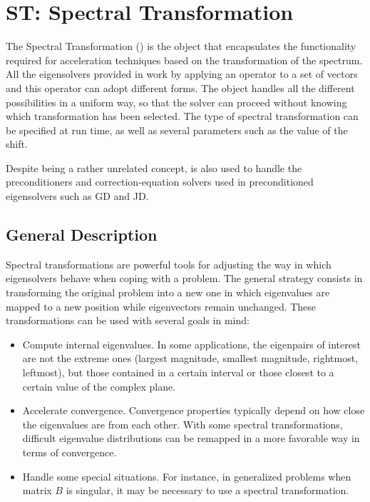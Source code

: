 \chapter{\label{cap:st}ST: Spectral Transformation}

\noindent The Spectral Transformation () is the \slepc object that encapsulates the functionality required for acceleration techniques based on the transformation of the spectrum. All the eigensolvers provided in  work by applying an operator to a set of vectors and this operator can adopt different forms. The  object handles all the different possibilities in a uniform way, so that the solver can proceed without knowing which transformation has been selected. The type of spectral transformation can be specified at run time, as well as several parameters such as the value of the shift.

	Despite being a rather unrelated concept,  is also used to handle the preconditioners and correction-equation solvers used in preconditioned eigensolvers such as GD and JD.

\section{General Description}

	Spectral transformations are powerful tools for adjusting the way in which eigensolvers behave when coping with a problem. The general strategy consists in transforming the original problem into a new one in which eigenvalues are mapped to a new position while eigenvectors remain unchanged. These transformations can be used with several goals in mind:
\begin{itemize}
\item Compute internal eigenvalues. In some applications, the eigenpairs of interest are not the extreme ones (largest magnitude, smallest magnitude, rightmost, leftmost), but those contained in a certain interval or those closest to a certain value of the complex plane.
\item Accelerate convergence. Convergence properties typically depend on how close the eigenvalues are from each other. With some spectral transformations, difficult eigenvalue distributions can be remapped in a more favorable way in terms of convergence. 
\item Handle some special situations. For instance, in generalized problems when matrix $B$ is singular, it may be necessary to use a spectral transformation.
\end{itemize}
	
